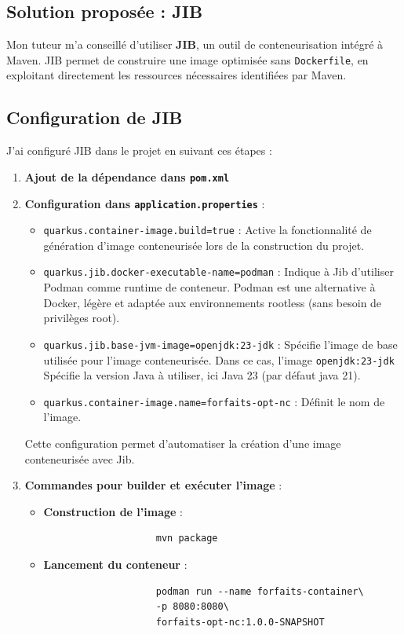 \documentclass[11pt]{article}
\begin{document}
		\subsection*{Solution proposée : JIB}
		
		Mon tuteur m'a conseillé d'utiliser \textbf{JIB}, un outil de conteneurisation intégré à Maven. JIB permet de construire une image optimisée sans \texttt{Dockerfile}, en exploitant directement les ressources nécessaires identifiées par Maven.
		
		\subsection*{Configuration de JIB}
		
		J'ai configuré JIB dans le projet en suivant ces étapes :
		\begin{enumerate}
			\item \textbf{Ajout de la dépendance dans \texttt{pom.xml}}
			\item \textbf{Configuration dans \texttt{application.properties}} :	
			
			\begin{itemize}
				\item \texttt{quarkus.container-image.build=true} : Active la fonctionnalité de génération d'image conteneurisée lors de la construction du projet.
				\item \texttt{quarkus.jib.docker-executable-name=podman} : Indique à Jib d'utiliser Podman comme runtime de conteneur. Podman est une alternative à Docker, légère et adaptée aux environnements rootless (sans besoin de privilèges root).
				\item \texttt{quarkus.jib.base-jvm-image=openjdk:23-jdk} : Spécifie l'image de base utilisée pour l'image conteneurisée. Dans ce cas, l'image \texttt{openjdk:23-jdk} Spécifie la version Java à utiliser, ici Java 23 (par défaut java 21).
				\item \texttt{quarkus.container-image.name=forfaits-opt-nc} : Définit le nom de l'image.
			\end{itemize}
	
			Cette configuration permet d'automatiser la création d'une image conteneurisée avec Jib.
			\item \textbf{Commandes pour builder et exécuter l'image} :
			\begin{itemize}
				\item \textbf{Construction de l'image} :
				\begin{verbatim}
					mvn package
				\end{verbatim}
				\item \textbf{Lancement du conteneur} :
				\begin{verbatim}
					podman run --name forfaits-container\
					-p 8080:8080\
					forfaits-opt-nc:1.0.0-SNAPSHOT
				\end{verbatim}
			\end{itemize}
		\end{enumerate}
\end{document}
